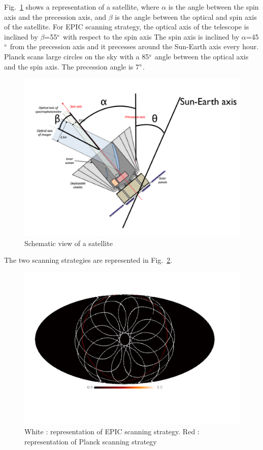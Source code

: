 Fig.~\ref{fig:satellite} shows a representation of a satellite, where $\alpha$ is the angle between the spin axis and the precession axis, and $\beta$ is the angle between the optical and spin axis of the satellite.
For EPIC scanning strategy, the optical axis of the telescope is inclined by $\beta$=55$\degree$ with respect to the spin axis The spin axis is inclined by $\alpha$=45$\degree$ from the precession axis and it precesses around the Sun-Earth axis every hour.
Planck scans large circles on the sky with a 85$\degree$ angle between the optical axis and the spin axis. The precession angle is 7$\degree$.

\begin{figure}[h]
  \includegraphics[clip,angle=0,width=\columnwidth]{Figures/schema_satellite.png}
  \caption{Schematic view of a satellite}
  \label{fig:satellite}
\end{figure}

The two scanning strategies are represented in Fig.~\ref{fig:strat-polsat-Planck}.

\begin{figure}[h]
  \includegraphics[clip,angle=0,width=\columnwidth]{Figures/plot_mollweide.pdf}
  \caption{White : representation of EPIC scanning strategy. Red : representation of Planck scanning strategy }
  \label{fig:strat-polsat-Planck}
\end{figure}

